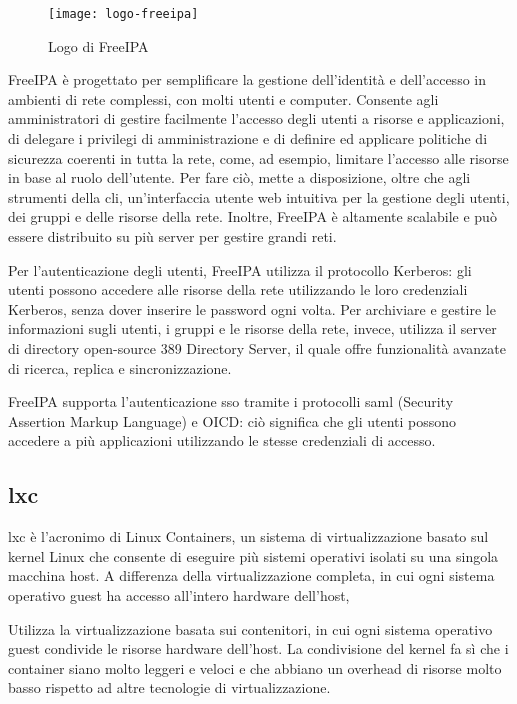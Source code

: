 \begin{figure}[!h] 
    \centering 
    \texttt{[image: logo-freeipa]} 
    \caption{Logo di FreeIPA}
    \label{fig:logo-freeipa}
\end{figure}


FreeIPA è progettato per semplificare la gestione dell'identità e dell'accesso in ambienti di rete complessi, con molti utenti e computer. Consente agli amministratori di gestire facilmente l'accesso degli utenti a risorse e applicazioni, di delegare i privilegi di amministrazione e di definire ed applicare politiche di sicurezza coerenti in tutta la rete, come, ad esempio, limitare l'accesso alle risorse in base al ruolo dell'utente. Per fare ciò, mette a disposizione, oltre che agli strumenti della \acrshort{cli}, un'interfaccia utente web intuitiva per la gestione degli utenti, dei gruppi e delle risorse della rete. Inoltre, FreeIPA è altamente scalabile e può essere distribuito su più server per gestire grandi reti.

Per l'autenticazione degli utenti, FreeIPA utilizza il protocollo Kerberos: gli utenti possono accedere alle risorse della rete utilizzando le loro credenziali Kerberos, senza dover inserire le password ogni volta.
Per archiviare e gestire le informazioni sugli utenti, i gruppi e le risorse della rete, invece, utilizza il server di directory open-source 389 Directory Server, il quale offre funzionalità avanzate di ricerca, replica e sincronizzazione.

FreeIPA supporta l'autenticazione \acrshort{sso} tramite i protocolli \acrfull{saml} (Security Assertion Markup Language) e OICD: ciò significa che gli utenti possono accedere a più applicazioni utilizzando le stesse credenziali di accesso.

\subsection{\acrlong{lxc}}
\acrfull{lxc} è l'acronimo di Linux Containers, un sistema di virtualizzazione basato sul kernel Linux che consente di eseguire più sistemi operativi isolati su una singola macchina host. A differenza della virtualizzazione completa, in cui ogni sistema operativo guest ha accesso all'intero hardware dell'host, 

Utilizza la virtualizzazione basata sui contenitori, in cui ogni sistema operativo guest condivide le risorse hardware dell'host.
La condivisione del kernel fa sì che i container siano molto leggeri e veloci e che abbiano un overhead di risorse molto basso rispetto ad altre tecnologie di virtualizzazione.


